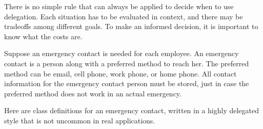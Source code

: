 There is no simple rule that can always be applied to decide when to use delegation. Each situation has to be evaluated in context, and there may be tradeoffs among different goals. To make an informed decision, it is important to know what the costs are.

\begin{example} 
Suppose an emergency contact is needed for each employee. An emergency contact is a person along with a preferred method to reach her.  The preferred method can be email, cell phone, work phone, or home phone. All contact information for the emergency contact person must be stored, just in case the preferred method does not work in an actual emergency. 
\end{example}
Here are class definitions for an emergency contact, written in a highly delegated style that is not uncommon in real applications. 

